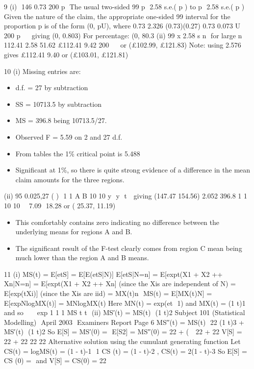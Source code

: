 \documentclass[a4paper,12pt]{article}
\begin{document}
\begin{enumerate}
\end{enumerate}
\newpage

9 (i)  146 0.73
200
p 
The usual two-sided 99%
p  2.58 s.e.( p ) to p  2.58 s.e.( p )
Given the nature of the claim, the appropriate one-sided 99%
interval for the proportion p is of the form (0, pU),
where 0.73 2.326 (0.73)(0.27) 0.73 0.073
U 200 p     giving (0, 0.803)
For percentage: (0, 80.3%
(ii) 99%
x 2.58 s
n
 for large n
112.41 2.58 51.62 £112.41 9.42
200
    or (£102.99, £121.83)
Note: using 2.576 gives £112.41 9.40 or (£103.01, £121.81)

10 (i) Missing entries are:
\begin{itemize}
    \item d.f. = 27 by subtraction
    \item SS = 10713.5 by subtraction
    \item MS = 396.8 being 10713.5/27.
    \item Observed F = 5.59 on 2 and 27 d.f.
    \item From tables the 1\% critical point is 5.488
    \item Significant at 1\%, so there is quite strong evidence of a difference in the mean
claim amounts for the three regions.
\end{itemize}

(ii) 95%
0.025,27
( )  1 1
A B 10 10 y  y  t  
giving
(147.47 154.56) 2.052 396.8 1 1
10 10
  
	7.09  18.28 or (	25.37, 11.19)
	\begin{itemize}
    \item
This comfortably contains zero indicating no difference between the
underlying means for regions A and B.
\item The significant result of the F-test clearly comes from region C mean being
much lower than the region A and B means.
\end{itemize}
11 (i) MS(t) = E[etS] = E[E(etS|N)]
E[etS|N=n] = E[exp{t(X1 + X2 ++ Xn}|N=n]
= E[exp{t(X1 + X2 ++ Xn}] (since the Xis are independent of N)
= 
 E[exp(tXi)] (since the Xis are iid)
= {MX(t)}n
 MS(t) = E[{MX(t)}N] = E[exp{NlogMX(t)}] = MN{logMX(t)}
Here MN(t) = exp{(et  1)} and MX(t) = (1 	t)1 and so
     exp 1 1 1 MS t t       	 
(ii) MS′(t) = MS(t)  (1 	 t)2
Subject 101 (Statistical Modelling)  April 2003  Examiners Report
Page 6
MS′′(t) = MS(t)  22 (1 	 t)3 + MS′(t)  (1 	 t)2
So E[S] = MS′(0) = 
E[S2] = MS′′(0) = 22 + (  
22 + 22
V[S] = 22 + 22	22
22
Alternative solution using the cumulant generating function
Let CS(t) = logMS(t) = {(1 - t)-1  1}
CS (t) = (1 - t)-2 , CS(t) = 2(1 - t)-3
So E[S] = CS (0) =  and V[S] = CS(0) = 22
\end{document}
